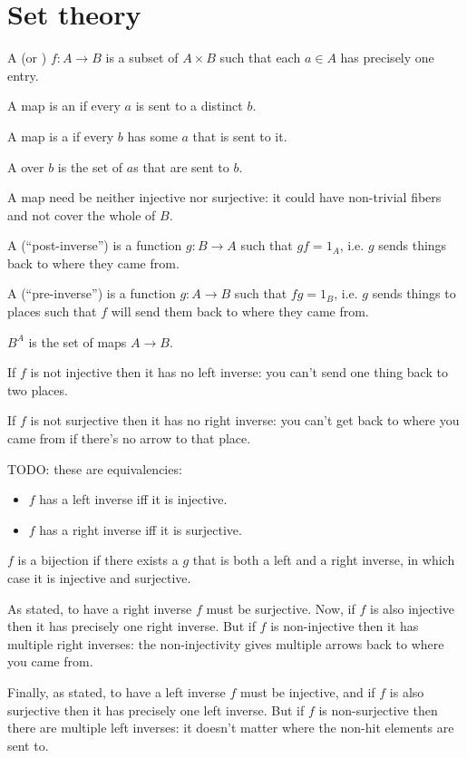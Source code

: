 \section{Set theory}

\begin{definition}
  A  (or ) $f: A \to B$ is a subset of $A \times B$ such that each $a \in A$ has precisely one entry.

  A map is an  if every $a$ is sent to a distinct $b$.

  A map is a  if every $b$ has some $a$ that is sent to it.

  A  over $b$ is the set of $a$s that are sent to $b$.

  A map need be neither injective nor surjective: it could have non-trivial fibers and not cover the whole of $B$.

  A  (``post-inverse​'') is a function $g: B \to A$ such that $gf = 1_A$, i.e. $g$ sends things back to where they came from.

  A  (``pre-inverse​'') is a function $g: A \to B$ such that $fg = 1_B$, i.e. $g$ sends things to places such that $f$ will send them back to where they came from.

  $B^A$ is the set of maps $A \to B$.
\end{definition}

\begin{theorem*}

  If $f$ is not injective then it has no left inverse: you can't send one thing back to two places.

  If $f$ is not surjective then it has no right inverse: you can't get back to where you came from
  if there's no arrow to that place.

  TODO: these are equivalencies:
  \begin{itemize}
  \item $f$ has a left inverse iff it is injective.
  \item $f$ has a right inverse iff it is surjective.
  \end{itemize}

  $f$ is a bijection if there exists a $g$ that is both a left and a right inverse, in which case
  it is injective and surjective.

  As stated, to have a right inverse $f$ must be surjective. Now, if $f$ is also injective then it
  has precisely one right inverse. But if $f$ is non-injective then it has multiple right inverses:
  the non-injectivity gives multiple arrows back to where you came from.

  Finally, as stated, to have a left inverse $f$ must be injective, and if $f$ is also surjective
  then it has precisely one left inverse. But if $f$ is non-surjective then there are multiple left
  inverses: it doesn't matter where the non-hit elements are sent to.
\end{theorem*}








